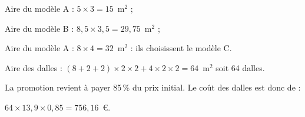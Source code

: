 
\medskip

%
%
%
%
%
%
%
%
%
%
%
%
%
%
%
%
%
%
%
%
%

Aire du modèle A : $5 \times 3 = 15$~m$^2$ ;

Aire du modèle B : $8,5 \times 3,5 = 29,75$~m$^2$ ;

Aire du modèle A : $8 \times 4 = 32$~m$^2$ : ils choisissent le modèle C.

Aire des dalles : $(8 + 2 + 2) \times 2 \times 2 + 4 \times 2 \times 2 = 64$~m$^2$ soit 64 dalles.

La promotion revient à payer 85\,\% du prix initial. Le coût des dalles est donc de :

$64 \times 13,9 \times 0,85 = 756,16$~\euro.
\vspace{0.25cm}

